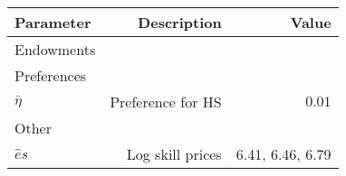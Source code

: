 \begin{tabular}{lrr}
\hline
Parameter & Description  & Value  \\ 
\hline
Endowments &   &   \\ 
Preferences &   &   \\ 
$\bar{\eta}$ & Preference for HS  & $0.01$  \\ 
Other &   &   \\ 
$\hat{e}{s}$ & Log skill prices  & 6.41, 6.46, 6.79  \\ 
\hline
\end{tabular}%
